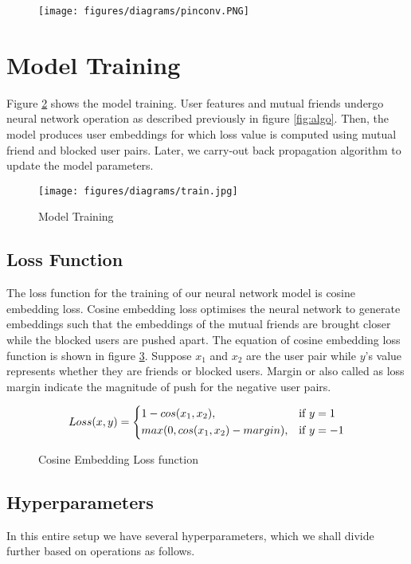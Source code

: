 \documentclass{kththesis}
\begin{document}
\begin{figure}[h!]
\centering
\captionsetup{justification=centering}
\texttt{[image: figures/diagrams/pinconv.PNG]}
\label{fig:pinconv}
\end{figure}
\section{Model Training}
Figure \ref{fig:train} shows the model training. User features and mutual friends undergo neural network operation as described previously in figure \ref{fig:algo}. Then, the model produces user embeddings for which loss value is computed using  mutual friend and blocked user pairs. Later, we carry-out back propagation algorithm to update the model parameters.

\begin{figure}[h!]
\centering
\texttt{[image: figures/diagrams/train.jpg]}
\caption{Model Training}
\label{fig:train}
\end{figure}

\subsection{Loss Function}
The loss function for the training of our neural network model is cosine embedding loss. Cosine embedding loss optimises the neural network to generate embeddings such that the embeddings of the mutual friends are brought closer while the blocked users are pushed apart. The equation of cosine embedding loss function is shown in figure \ref{fig:closs}. Suppose $x_1$ and $x_2$ are the user pair while $y$'s value represents whether they are friends or blocked users. Margin or also called as loss margin indicate the magnitude of push for the negative user pairs. \\

\begin{figure}[h!]
\centering
\[
    Loss(x,y)= 
\begin{dcases}
    1-cos(x_1, x_2), & \text{if } y = 1\\
    max(0, cos(x_1, x_2) - margin), & \text{if } y = -1
\end{dcases}
\]
\caption{Cosine Embedding Loss function}
\label{fig:closs}
\end{figure}

\subsection{Hyperparameters}
In this entire setup we have several hyperparameters, which we shall divide further based on operations as follows.
\end{document}
